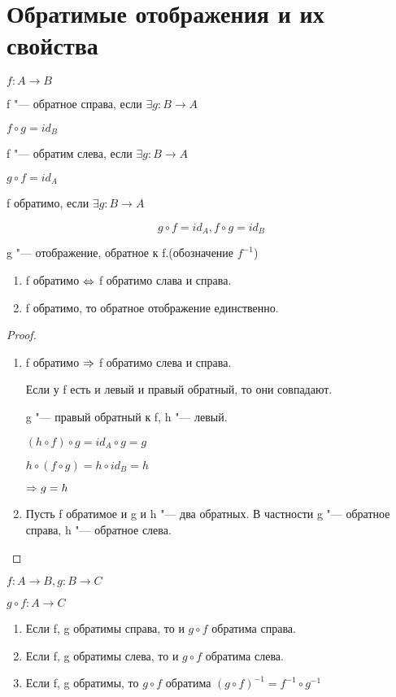 ﻿\section{Обратимые отображения и их свойства}

$f: A \to B$

\begin{Def}
f "--- обратное справа, если $\exists g: B \to A$

$f \circ g = id_B$

f "--- обратим слева, если $\exists g: B \to A$

$g \circ f = id_A$

f обратимо, если $\exists g: B \to A$

$$g \circ f = id_A, f \circ g = id_B$$

g "--- отображение, обратное к f.(обозначение $f^{-1}$)
\end{Def}

\begin{theorem}{}

\begin{enumerate}
\item f обратимо $\Leftrightarrow$ f обратимо слава и справа.
\item f обратимо, то обратное отображение единственно.
\end{enumerate}

\end{theorem}

\begin{proof}
\begin{enumerate}
\item f обратимо $\Rightarrow$ f обратимо слева и справа.

Если у f есть и левый и правый обратный, то они совпадают. 

g "--- правый обратный к f, h "--- левый.

$(h \circ f) \circ g = id_A \circ g = g$

$h \circ (f \circ g) = h \circ id_B = h$

$\Rightarrow g = h$

\item Пусть f обратимое и g и h "--- два обратных. В частности g "--- обратное справа, h "--- обратное слева.
\end{enumerate}
\end{proof}

\begin{theorem}{}
$f:A \to B, g:B \to C$

$g \circ f: A \to C$

\begin{enumerate}
\item Если f, g обратимы справа, то и $g \circ f$ обратима справа.
\item Если f, g обратимы слева, то и $g \circ f$ обратима слева.
\item Если f, g обратимы, то $g \circ f$ обратима $(g \circ f)^{-1} = f^{-1} \circ g^{-1}$
\end{enumerate}
\end{theorem}


